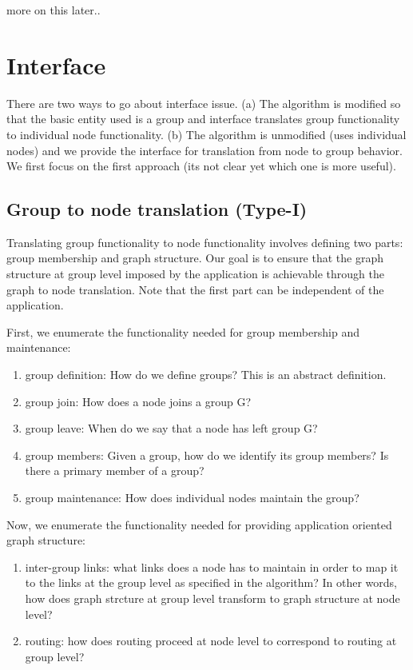 more on this later..

\section{Interface}
There are two ways to go about interface issue. (a) The algorithm is modified so that the basic entity used is a group and interface translates group functionality to individual node functionality. (b) The algorithm is unmodified (uses individual nodes) and we provide the interface for translation from node to group behavior. We first focus on the first approach (its not clear yet which one is more useful).


\subsection{Group to node translation (Type-I)}
Translating group functionality to node functionality involves defining two parts: group membership and graph structure. Our goal is to ensure that the graph structure at group level imposed by the application is achievable through the graph to node translation. Note that the first part can be independent of the application.

First, we enumerate the functionality needed for group membership and maintenance:
\begin{enumerate}
\item{group definition:} How do we define groups? This is an abstract definition.
\item{group join:} How does a node joins a group G?
\item{group leave:} When do we say that a node has left group G?
\item{group members:} Given a group, how do we identify its group members? Is there a primary member of a group?
\item{group maintenance:} How does individual nodes maintain the group?
\end{enumerate}

Now, we enumerate the functionality needed for providing application oriented graph structure:
\begin{enumerate}
\item{inter-group links:} what links does a node has to maintain in order to map it to the links at the group level as specified in the algorithm? In other words, how does graph strcture at group level transform to graph structure at node level?
\item{routing:} how does routing proceed at node level to correspond to routing at group level?
\end{enumerate}

